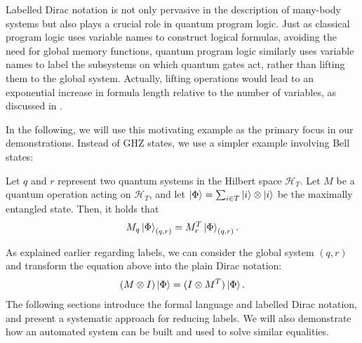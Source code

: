 Labelled Dirac notation is not only pervasive in the description of many-body systems but also plays a crucial role in quantum program logic. Just as classical program logic uses variable names to construct logical formulas, avoiding the need for global memory functions, quantum program logic similarly uses variable names to label the subsystems on which quantum gates act, rather than lifting them to the global system. Actually, lifting operations would lead to an exponential increase in formula length relative to the number of variables, as discussed in \cite{QSL_Le_2022}.

In the following, we will use this motivating example as the primary focus in our demonstrations. Instead of GHZ states, we use a simpler example involving Bell states:
\begin{example}
    \label{ex: motivating}
    Let \( q \) and \( r \) represent two quantum systems in the Hilbert space \( \mathcal{H}_T \). Let \( M \) be a quantum operation acting on \( \mathcal{H}_T \), and let \( \ket{\Phi} = \sum_{i \in T} \ket{i} \otimes \ket{i} \) be the maximally entangled state. Then, it holds that
    \[
    M_q \ket{\Phi}_{(q, r)} = M_r^T \ket{\Phi}_{(q, r)}.
    \]
\end{example}
As explained earlier regarding labels, we can consider the global system $(q,r)$ and transform the equation above into the plain Dirac notation:
\begin{align}
    (M \otimes I) \ket{\Phi} = (I \otimes M^T) \ket{\Phi}.
    \label{eq: motivating plain}
\end{align}
The following sections introduce the formal language and labelled Dirac notation, and present a systematic approach for reducing labels. We will also demonstrate how an automated system can be built and used to solve similar equalities.


